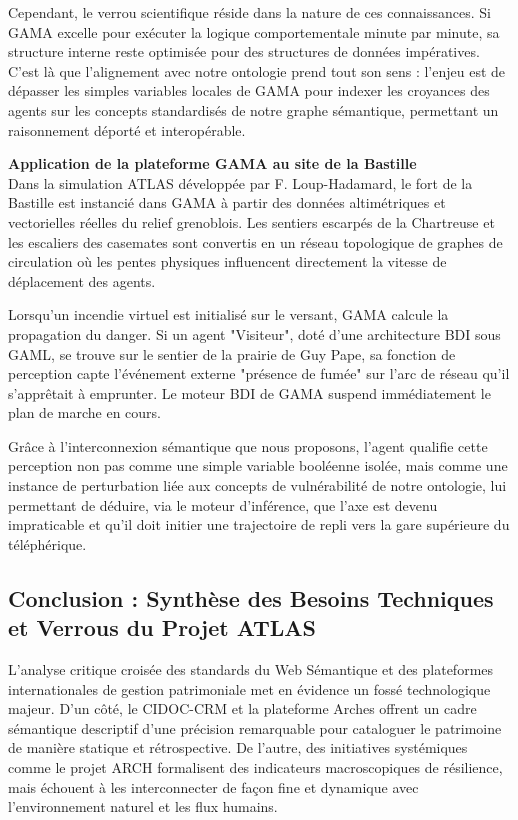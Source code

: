 \documentclass{article}
\begin{document}
Cependant, le verrou scientifique réside dans la nature de ces connaissances. Si GAMA excelle pour exécuter la logique comportementale minute par minute, sa structure interne reste optimisée pour des structures de données impératives. C'est là que l'alignement avec notre ontologie prend tout son sens : l'enjeu est de dépasser les simples variables locales de GAMA pour indexer les croyances des agents sur les concepts standardisés de notre graphe sémantique, permettant un raisonnement déporté et interopérable.

\begin{filrouge}
\textbf{Application de la plateforme GAMA au site de la Bastille} \\
Dans la simulation ATLAS développée par F. Loup-Hadamard, le fort de la Bastille est instancié dans GAMA à partir des données altimétriques et vectorielles réelles du relief grenoblois. Les sentiers escarpés de la Chartreuse et les escaliers des casemates sont convertis en un réseau topologique de graphes de circulation où les pentes physiques influencent directement la vitesse de déplacement des agents.

Lorsqu'un incendie virtuel est initialisé sur le versant, GAMA calcule la propagation du danger. Si un agent "Visiteur", doté d'une architecture BDI sous GAML, se trouve sur le sentier de la prairie de Guy Pape, sa fonction de perception capte l'événement externe "présence de fumée" sur l'arc de réseau qu'il s'apprêtait à emprunter. Le moteur BDI de GAMA suspend immédiatement le plan de marche en cours. 

Grâce à l'interconnexion sémantique que nous proposons, l'agent qualifie cette perception non pas comme une simple variable booléenne isolée, mais comme une instance de perturbation liée aux concepts de vulnérabilité de notre ontologie, lui permettant de déduire, via le moteur d'inférence, que l'axe est devenu impraticable et qu'il doit initier une trajectoire de repli vers la gare supérieure du téléphérique.
\end{filrouge}
\subsection{Conclusion : Synthèse des Besoins Techniques et Verrous du Projet ATLAS}
\label{subsec:conclusion_besoins_techniques}

L’analyse critique croisée des standards du Web Sémantique et des plateformes internationales de gestion patrimoniale met en évidence un fossé technologique majeur. D’un côté, le CIDOC-CRM et la plateforme Arches offrent un cadre sémantique descriptif d’une précision remarquable pour cataloguer le patrimoine de manière statique et rétrospective. De l’autre, des initiatives systémiques comme le projet ARCH formalisent des indicateurs macroscopiques de résilience, mais échouent à les interconnecter de façon fine et dynamique avec l’environnement naturel et les flux humains.
\end{document}
